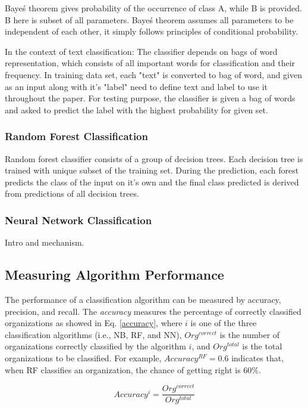 \documentclass[12pt]{article}
\begin{document}
Baye\'s theorem gives probability of the occurrence of class A, while B is provided. B here is subset of all parameters. Baye\'s theorem assumes all parameters to be independent of each other, it simply follows principles of conditional probability.

In the context of text classification: The classifier depends on bags of word representation, which consists of all important words for classification and their frequency. In training data set, each "text" is converted to bag of word, and given as an input along with it's "label" {need to define text and label to use it throughout the paper}. For testing purpose, the classifier is given a bag of words and asked to predict the label with the highest probability for given set.

\subsubsection{Random Forest Classification}

Random forest classifier consists of a group of decision trees. Each decision tree is trained with unique subset of the training set. During the prediction, each forest predicts the class of the input on it's own and the final class predicted is derived from predictions of all decision trees.

\subsubsection{Neural Network Classification}

Intro and mechanism.

\subsection{Measuring Algorithm Performance}

The performance of a classification algorithm can be measured by {accuracy}, {precision}, and {recall}. The \textit{accuracy} measures the percentage of correctly classified organizations as showed in Eq. \ref{accuracy}, where $i$ is one of the three classification algorithms (i.e., NB, RF, and NN), $Org^{correct}$ is the number of organizations correctly classified by the algorithm $i$, and $Org^{total}$ is the total organizations to be classified. For example, $Accuracy^{RF}=0.6$ indicates that, when RF classifies an organization, the chance of getting right is 60\%.

\begin{equation} \label{accuracy}
    Accuracy^i=\frac{Org^{correct}}{Org^{total}}
\end{equation}
\end{document}

